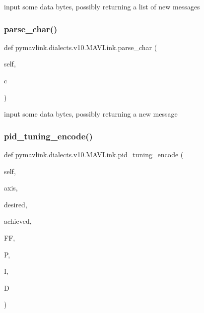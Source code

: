 \begin{DoxyVerb}
\begin{DoxyVerb}
\begin{DoxyVerb}
\begin{DoxyVerb}
\begin{DoxyVerb}input some data bytes, possibly returning a list of new messages\end{DoxyVerb}
 \mbox{\label{classpymavlink_1_1dialects_1_1v10_1_1MAVLink_a9de87e501ae6a392dd29d2ee14b7601c}} 
\subsubsection{\texorpdfstring{parse\+\_\+char()}{parse\_char()}}
{\footnotesize\ttfamily def pymavlink.\+dialects.\+v10.\+M\+A\+V\+Link.\+parse\+\_\+char (\begin{DoxyParamCaption}\item[{}]{self,  }\item[{}]{c }\end{DoxyParamCaption})}

\begin{DoxyVerb}input some data bytes, possibly returning a new message\end{DoxyVerb}
 \mbox{\label{classpymavlink_1_1dialects_1_1v10_1_1MAVLink_a11aa75e792bd584e7c3f649e5a8c1ad8}} 
\subsubsection{\texorpdfstring{pid\+\_\+tuning\+\_\+encode()}{pid\_tuning\_encode()}}
{\footnotesize\ttfamily def pymavlink.\+dialects.\+v10.\+M\+A\+V\+Link.\+pid\+\_\+tuning\+\_\+encode (\begin{DoxyParamCaption}\item[{}]{self,  }\item[{}]{axis,  }\item[{}]{desired,  }\item[{}]{achieved,  }\item[{}]{FF,  }\item[{}]{P,  }\item[{}]{I,  }\item[{}]{D }\end{DoxyParamCaption})}


\end{DoxyVerb}
\end{DoxyVerb}
\end{DoxyVerb}
\end{DoxyVerb}
